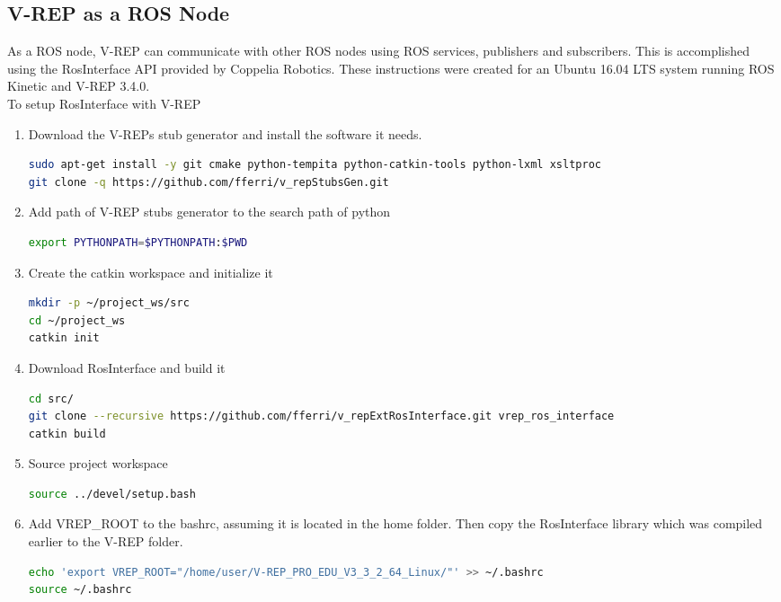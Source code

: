\documentclass{article}
\begin{document}
\begin{multicols*}{2}
\subsection{V-REP as a ROS Node}
\indent \indent As a ROS node, V-REP can communicate with other ROS nodes using ROS services, publishers and subscribers. This is accomplished using the RosInterface API provided by Coppelia Robotics. These instructions were created for an Ubuntu 16.04 LTS system running ROS Kinetic and V-REP 3.4.0. 
\\
\indent To setup RosInterface with V-REP 
\begin{enumerate}
\item Download the V-REPs stub generator and install the software it needs. 
\begin{lstlisting}[language=bash,breaklines=true]
sudo apt-get install -y git cmake python-tempita python-catkin-tools python-lxml xsltproc
git clone -q https://github.com/fferri/v_repStubsGen.git
\end{lstlisting}
\item Add path of V-REP stubs generator to the search path of python 
\begin{lstlisting}[language=bash,breaklines=true]
export PYTHONPATH=$PYTHONPATH:$PWD
\end{lstlisting}
\item Create the catkin workspace and initialize it 
\begin{lstlisting}[language=bash,breaklines=true]
mkdir -p ~/project_ws/src
cd ~/project_ws
catkin init
\end{lstlisting}
\item Download RosInterface and build it 
\begin{lstlisting}[language=bash,breaklines=true]
cd src/
git clone --recursive https://github.com/fferri/v_repExtRosInterface.git vrep_ros_interface
catkin build
\end{lstlisting}
\item Source project workspace
\begin{lstlisting}[language=bash,breaklines=true]
source ../devel/setup.bash
\end{lstlisting}
\item Add VREP\_ROOT to the bashrc, assuming it is located in the home folder. Then copy the RosInterface library which was compiled earlier to the V-REP folder.
\begin{lstlisting}[language=bash,breaklines=true]
echo 'export VREP_ROOT="/home/user/V-REP_PRO_EDU_V3_3_2_64_Linux/"' >> ~/.bashrc 
source ~/.bashrc

\end{lstlisting}
\end{enumerate}
\end{multicols*}
\end{document}
